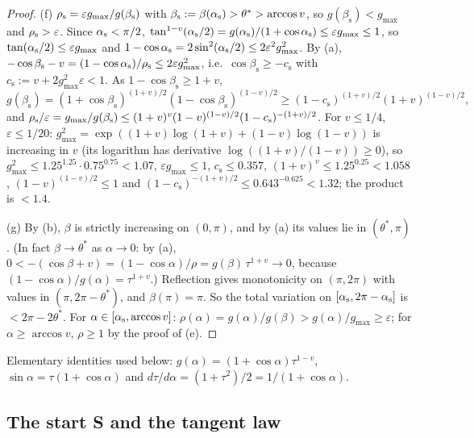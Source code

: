 \begin{proof}
(f) $\rho_{\mathrm s}=\varepsilon g_{\max}/g(\beta_{\mathrm s})$ with $\beta_{\mathrm s}:=\beta(\alpha_{\mathrm s})>\theta^*>\arccos v$, so
$g(\beta_{\mathrm s})<g_{\max}$ and $\rho_{\mathrm s}>\varepsilon$. Since $\alpha_{\mathrm s}<\pi/2$,
$\tan^{1-v}(\alpha_{\mathrm s}/2)=g(\alpha_{\mathrm s})/(1+\cos\alpha_{\mathrm s})\le\varepsilon g_{\max}\le1$, so $\tan(\alpha_{\mathrm s}/2)\le\varepsilon g_{\max}$ and
$1-\cos\alpha_{\mathrm s}=2\sin^2(\alpha_{\mathrm s}/2)\le2\varepsilon^2g_{\max}^2$. By (a),
$-\cos\beta_{\mathrm s}-v=(1-\cos\alpha_{\mathrm s})/\rho_{\mathrm s}\le2\varepsilon g_{\max}^2$, i.e.\ $\cos\beta_{\mathrm s}\ge-c_{\mathrm s}$ with
$c_{\mathrm s}:=v+2g_{\max}^2\varepsilon<1$. As $1-\cos\beta_{\mathrm s}\ge1+v$,
\[
g(\beta_{\mathrm s})=(1+\cos\beta_{\mathrm s})^{(1+v)/2}(1-\cos\beta_{\mathrm s})^{(1-v)/2}\ge(1-c_{\mathrm s})^{(1+v)/2}(1+v)^{(1-v)/2},
\]
and $\rho_{\mathrm s}/\varepsilon=g_{\max}/g(\beta_{\mathrm s})\le(1+v)^v(1-v)^{(1-v)/2}(1-c_{\mathrm s})^{-(1+v)/2}$. For $v\le1/4$,
$\varepsilon\le1/20$: $g_{\max}^2=\exp((1+v)\log(1+v)+(1-v)\log(1-v))$ is increasing in $v$ (its logarithm has derivative
$\log((1+v)/(1-v))\ge0$), so $g_{\max}^2\le1.25^{1.25}\cdot0.75^{0.75}<1.07$, $\varepsilon g_{\max}\le1$, $c_{\mathrm s}\le0.357$,
$(1+v)^v\le1.25^{0.25}<1.058$, $(1-v)^{(1-v)/2}\le1$ and $(1-c_{\mathrm s})^{-(1+v)/2}\le0.643^{-0.625}<1.32$; the product is $<1.4$.

(g) By (b), $\beta$ is strictly increasing on $(0,\pi)$, and by (a) its values lie in $(\theta^*,\pi)$. (In fact $\beta\to\theta^*$ as
$\alpha\to0$: by (a), $0<-(\cos\beta+v)=(1-\cos\alpha)/\rho=g(\beta)\,\tau^{1+v}\to0$, because
$(1-\cos\alpha)/g(\alpha)=\tau^{1+v}$.) Reflection gives monotonicity on $(\pi,2\pi)$ with values in $(\pi,2\pi-\theta^*)$, and
$\beta(\pi)=\pi$. So the total variation on $[\alpha_{\mathrm s},2\pi-\alpha_{\mathrm s}]$ is $<2\pi-2\theta^*$. For $\alpha\in[\alpha_{\mathrm s},\arccos v]$:
$\rho(\alpha)=g(\alpha)/g(\beta)>g(\alpha)/g_{\max}\ge\varepsilon$; for $\alpha\ge\arccos v$, $\rho\ge1$ by the proof of (e).
\end{proof}

Elementary identities used below: $g(\alpha)=(1+\cos\alpha)\tau^{1-v}$, $\sin\alpha=\tau(1+\cos\alpha)$ and
$d\tau/d\alpha=(1+\tau^2)/2=1/(1+\cos\alpha)$.

\subsection{The start S and the tangent law}

